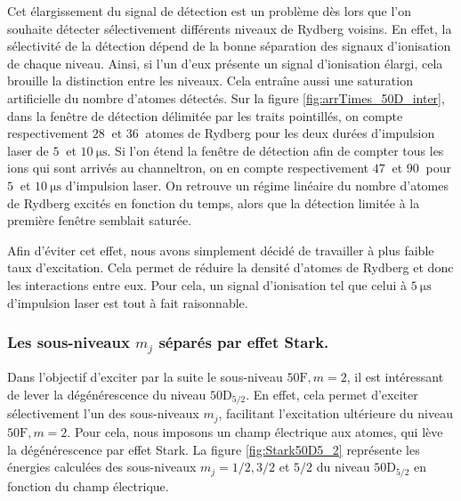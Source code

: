 Cet élargissement du signal de détection est un problème dès lors que l'on souhaite détecter sélectivement différents niveaux de Rydberg voisins.
En effet, la sélectivité de la détection dépend de la bonne séparation des signaux d'ionisation de chaque niveau.
Ainsi, si l'un d'eux présente un signal d'ionisation élargi, cela brouille la distinction entre les niveaux.
Cela entraîne aussi une saturation artificielle du nombre d'atomes détectés.
Sur la figure \eqref{fig:arrTimes_50D_inter}, dans la fenêtre de détection délimitée par les traits pointillés, on compte respectivement $\SI{28}{}$ et $\SI{36}{}$ atomes de Rydberg pour les deux durées d'impulsion laser de $\SI{5}{}$ et $\SI{10}{\us}$.
Si l'on étend la fenêtre de détection afin de compter tous les ions qui sont arrivés au channeltron, on en compte respectivement $\SI{47}{}$ et $\SI{90}{}$ pour $\SI{5}{}$ et $\SI{10}{\us}$ d'impulsion laser.
On retrouve un régime linéaire du nombre d'atomes de Rydberg excités en fonction du temps, alors que la détection limitée à la première fenêtre semblait saturée.

Afin d'éviter cet effet, nous avons simplement décidé de travailler à plus faible taux d'excitation.
Cela permet de réduire la densité d'atomes de Rydberg et donc les interactions entre eux.
Pour cela, un signal d'ionisation tel que celui à $\SI{5}{\us}$ d'impulsion laser est tout à fait raisonnable.

\clearpage		
\subsubsection*{Les sous-niveaux $m_j$ séparés par effet Stark.}
\noindent Dans l'objectif d'exciter par la suite le sous-niveau $\mathrm{50F},m=2$, il est intéressant de lever la dégénérescence du niveau $\mathrm{50D}_{5/2}$.
En effet, cela permet d'exciter sélectivement l'un des sous-niveaux $m_j$, facilitant l'excitation ultérieure du niveau $\mathrm{50F},m=2$.
Pour cela, nous imposons un champ électrique aux atomes, qui lève la dégénérescence par effet Stark.
La figure \eqref{fig:Stark50D5_2} représente les énergies calculées des sous-niveaux $m_j=1/2,3/2$ et $5/2$ du niveau $\mathrm{50D}_{5/2}$ en fonction du champ électrique.

